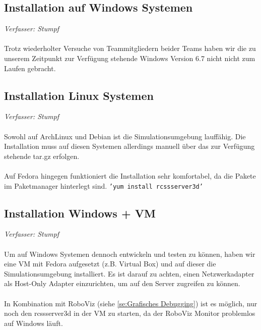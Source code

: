 \documentclass[fontsize=12pt,a4paper,final]{scrartcl}[2003/01/01]
\begin{document}
\subsection{Installation auf Windows Systemen}
\textit{Verfasser: Stumpf}\\
\\
Trotz wiederholter Versuche von Teammitgliedern beider Teams haben wir die zu unserem Zeitpunkt zur Verfügung stehende Windows Version 6.7 nicht nicht zum Laufen gebracht. 
\subsection{Installation Linux Systemen}
\textit{Verfasser: Stumpf}\\
\\
Sowohl auf ArchLinux und Debian ist die Simulationsumgebung lauffähig. Die Installation muss auf diesen Systemen allerdings manuell über das zur Verfügung stehende tar.gz erfolgen.\\
\\
Auf Fedora hingegen funktioniert die Installation sehr komfortabel, da die Pakete im Paketmanager hinterlegt sind. \texttt{'yum install rcssserver3d'}
\subsection{Installation Windows + VM}
\textit{Verfasser: Stumpf}\\
\\
Um auf Windows Systemen dennoch entwickeln und testen zu können, haben wir eine VM mit Fedora aufgesetzt (z.B. Virtual Box) und auf dieser die Simulationsumgebung installiert. Es ist darauf zu achten, einen Netzwerkadapter als Host-Only Adapter einzurichten, um auf den Server zugreifen zu können.\\
\\
In Kombination mit RoboViz (siehe \autoref{se:Grafisches Debugging}) ist es möglich, nur noch den rcssserver3d in der VM zu starten, da der RoboViz Monitor problemlos auf Windows läuft.
\end{document}
